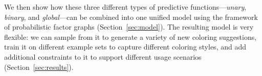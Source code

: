 We then show how these three different types of predictive functions---\emph{unary}, \emph{binary}, and \emph{global}---can be combined into one unified model using the framework of probabilistic factor graphs (Section~\ref{sec:model}). The resulting model is very flexible: we can sample from it to generate a variety of new coloring suggestions, train it on different example sets to capture different coloring styles, and add additional constraints to it to support different usage scenarios (Section~\ref{sec:results}).

%
